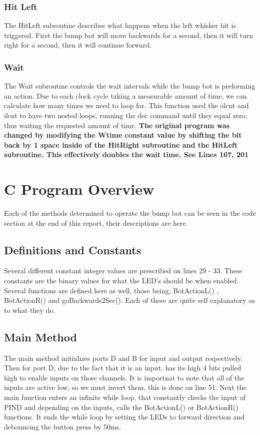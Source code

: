 \documentclass[12pt,letterpaper]{article}
\begin{document}
	\subsubsection{Hit Left}
	The HitLeft subroutine describes what happens when the left whisker bit is triggered. First the bump bot will move backwards for a second, then it will turn right for a second, then it will continue forward. 
	
	\subsubsection{Wait}
	The Wait subroutine controls the wait intervals while the bump bot is preforming an action. Due to each clock cycle taking a measurable amount of time, we can calculate how many times we need to loop for. This function used the olcnt and ilcnt to have two nested loops, running the dec command until they equal zero, thus waiting the requested amount of time. \textbf{The original program was changed by modifying the Wtime constant value by shifting the bit back by 1 space inside of the HitRight subroutine and the HitLeft subroutine. This effectively doubles the wait time. See Lines 167, 201}

\section{C Program Overview}
Each of the methods determined to operate the bump bot can be seen in the code section at the end of this report, their descriptions are here.

\subsection{Definitions and Constants}
Several different constant integer values are prescribed on lines 29 - 33. These constants are the binary values for what the LED's should be when enabled. Several functions are defined here as well, those being, BotActionL() , BotActionR() and goBackwards2Sec(). Each of these are quite self explanatory as to what they do.

\subsection{Main Method}
The main method initializes ports D and B for input and output respectively. Then for port D, due to the fact that it is an input, has its high 4 bits pulled high to enable inputs on those channels. It is importnat to note that all of the inputs are active low, so we must invert them, this is done on line 51. Next the main function enters an infinite while loop, that constantly checks the input of PIND and depending on the inputs, calls the BotActionL() or BotActionR() functions. It ends the while loop by setting the LEDs to forward direction and debouncing the button press by 50ms.
\end{document}
